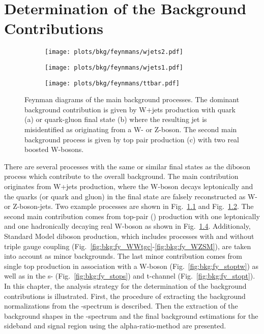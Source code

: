 \chapter{Determination of the Background Contributions}
\label{chap:DeterminationoftheBackgroundContributions}
\begin{figure}[Hb]
	\centering
	\begin{subfigure}{0.4\textwidth}
		\texttt{[image: plots/bkg/feynmans/wjets2.pdf]}
		\caption{}
		\label{fig:bkg:fy_wjets1}
	\end{subfigure}
	\begin{subfigure}{0.4\textwidth}
		\texttt{[image: plots/bkg/feynmans/wjets1.pdf]}
		\caption{}
		\label{fig:bkg:fy_wjets2}
	\end{subfigure}
	\begin{subfigure}{0.4\textwidth}
		\texttt{[image: plots/bkg/feynmans/ttbar.pdf]}
		\caption{}
		\label{fig:bkg:fy_ttbar}
	\end{subfigure}
	\caption[Feynman diagrams of the main background processes.]{Feynman diagrams of the main background processes. The dominant background contribution is given by W+jets production with quark (a) or quark-gluon final state (b) where the resulting jet is misidentified as originating from a W- or Z-boson. The second main background process is given by top pair production (c) with two real boosted W-bosons.}
\end{figure}
There are several processes with the same or similar final states as the diboson process which contribute to the overall background. The main contribution originates from W+jets production, where the W-boson decays leptonically and the quarks (or quark and gluon) in the final state are falsely reconstructed as W- or Z-boson-jets. Two example processes are shown in Fig.~\ref{fig:bkg:fy_wjets1} and Fig.~\ref{fig:bkg:fy_wjets2}. The second main contribution comes from top-pair (\ttbar) production with one leptonically and one hadronically decaying real W-boson as shown in Fig.~\ref{fig:bkg:fy_ttbar}. Additionaly, Standard Model diboson production, which includes processes with and without triple gauge coupling (Fig.~\ref{fig:bkg:fy_WWtgc}-\ref{fig:bkg:fy_WZSM}), are taken into account as minor backgrounds. The last minor contribution comes from single top production in association with a W-boson (Fig.~\ref{fig:bkg:fy_stoptw}) as well as in the s- (Fig.~\ref{fig:bkg:fy_stops}) and t-channel (Fig.~\ref{fig:bkg:fy_stopt}).\\
In this chapter, the analysis strategy for the determination of the background contributions is illustrated.  First, the procedure of extracting the background normalizations from the \Mpr -spectrum is described. Then the extraction of the background shapes in the \MWV -spectrum and the final background estimations for the sideband and signal region using the alpha-ratio-method are presented.

